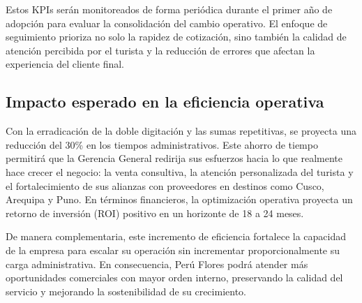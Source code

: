 \begin{indentedsubsection}
Estos KPIs serán monitoreados de forma periódica durante el primer año de adopción para evaluar la consolidación del cambio operativo. El enfoque de seguimiento prioriza no solo la rapidez de cotización, sino también la calidad de atención percibida por el turista y la reducción de errores que afectan la experiencia del cliente final.
\end{indentedsubsection}

\subsection{Impacto esperado en la eficiencia operativa}
\begin{indentedsubsection}
Con la erradicación de la doble digitación y las sumas repetitivas, se proyecta una reducción del 30\% en los tiempos administrativos. Este ahorro de tiempo permitirá que la Gerencia General redirija sus esfuerzos hacia lo que realmente hace crecer el negocio: la venta consultiva, la atención personalizada del turista y el fortalecimiento de sus alianzas con proveedores en destinos como Cusco, Arequipa y Puno. En términos financieros, la optimización operativa proyecta un retorno de inversión (ROI) positivo en un horizonte de 18 a 24 meses.

De manera complementaria, este incremento de eficiencia fortalece la capacidad de la empresa para escalar su operación sin incrementar proporcionalmente su carga administrativa. En consecuencia, Perú Flores podrá atender más oportunidades comerciales con mayor orden interno, preservando la calidad del servicio y mejorando la sostenibilidad de su crecimiento.
\end{indentedsubsection}
